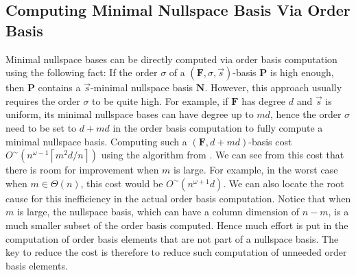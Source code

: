 \subsection{Computing Minimal Nullspace Basis Via Order Basis}

Minimal nullspace bases can be directly computed via order basis computation
using the following fact: If the order $\sigma$ of a $\left(\mathbf{F},\sigma,\vec{s}\right)$-basis
$\mathbf{P}$ is high enough, then $\mathbf{P}$ contains a $\vec{s}$-minimal
nullspace basis $\mathbf{N}$. However, this approach usually requires
the order $\sigma$ to be quite high. For example, if $\mathbf{F}$
has degree $d$ and $\vec{s}$ is uniform, its minimal nullspace bases
can have degree up to $md$, hence the order $\sigma$ need to be
set to $d+md$ in the order basis computation to fully compute a minimal
nullspace basis. Computing such a $\left(\mathbf{F},d+md\right)$-basis
cost $O^{\sim}\left(n^{\omega-1}\left\lceil m^{2}d/n\right\rceil \right)$
using the algorithm from \citep{za2009}. We can see from this cost
that there is room for improvement when $m$ is large. For example,
in the worst case when $m\in\Theta\left(n\right)$, this cost would
be $O^{\sim}\left(n^{\omega+1}d\right)$. We can also locate the root
cause for this inefficiency in the actual order basis computation.
Notice that when $m$ is large, the nullspace basis, which can have
a column dimension of $n-m$, is a much smaller subset of the order
basis computed. Hence much effort is put in the computation of order
basis elements that are not part of a nullspace basis. The key to
reduce the cost is therefore to reduce such computation of unneeded
order basis elements.
